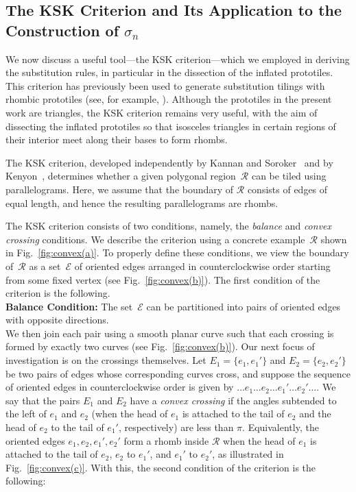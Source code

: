 \newpage

\subsection{The KSK Criterion and Its Application to the Construction of $\sigma_n$}
\noindent We now discuss a useful tool---the KSK criterion---which we employed in deriving the substitution rules, in particular in the dissection of the inflated prototiles. This criterion has previously been used to generate substitution tilings with rhombic prototiles (see, for example, \cite{Mal15, KarRis16, Pau17}). Although the prototiles in the present work are triangles, the KSK criterion remains very useful, with the aim of dissecting the inflated prototiles so that isosceles triangles in certain regions of their interior meet along their bases to form rhombs.

The KSK criterion, developed independently by Kannan and Soroker~\cite{KanSor92} and by Kenyon~\cite{Ken93}, determines whether a given polygonal region~$\mathcal{R}$ can be tiled using parallelograms. Here, we assume that the boundary of $\mathcal{R}$ consists of edges of equal length, and hence the resulting parallelograms are rhombs.

The KSK criterion consists of two conditions, namely, the \textit{balance} and \textit{convex crossing} conditions. We describe the criterion using a concrete example~$\mathcal{R}$ shown in Fig.~\ref{fig:convex(a)}. To properly define these conditions, we view the boundary of~$\mathcal{R}$ as a set~$\mathcal{E}$ of oriented edges arranged in counterclockwise order starting from some fixed vertex (see Fig.~\ref{fig:convex(b)}). The first condition of the criterion is the following. \\

\noindent \textbf{Balance Condition:} The set~$\mathcal{E}$ can be partitioned into pairs of oriented edges with opposite directions.\\

We then join each pair using a smooth planar curve such that each crossing is formed by exactly two curves (see Fig.~\ref{fig:convex(b)}). Our next focus of investigation is on the crossings themselves. Let \(E_1 = \{e_1, e_1'\}\) and \(E_2 = \{e_2, e_2'\}\) be two pairs of edges whose corresponding curves cross, and suppose the sequence of oriented edges in counterclockwise order is given by 
$\ldots e_1 \ldots e_2 \ldots e_1' \ldots e_2' \ldots.$
We say that the pairs \(E_1\) and \(E_2\) have a \textit{convex crossing} if the angles subtended to the left of \(e_1\) and \(e_2\) (when the head of \(e_1\) is attached to the tail of \(e_2\) and the head of \(e_2\) to the tail of \(e_1'\), respectively) are less than \(\pi\). Equivalently, the oriented edges \(e_1, e_2, e_1', e_2'\) form a rhomb inside \(\mathcal{R}\) when the head of \(e_1\) is attached to the tail of \(e_2\), \(e_2\) to \(e_1'\), and \(e_1'\) to \(e_2'\), as illustrated in Fig.~\ref{fig:convex(c)}. With this, the second condition of the criterion is the following:\\

